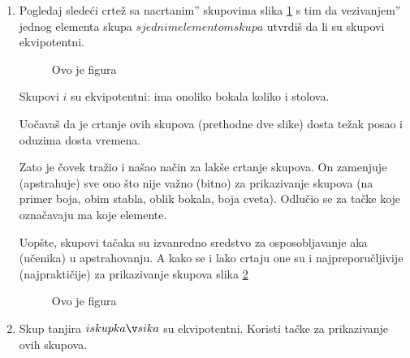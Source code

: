 

    \begin{enumerate}           %

    \item Pogledaj slede\' ci crte\v z sa nacrtanim'' skupovima slika \ref{slika1str26} s tim da vezivanjem'' jednog elementa skupa $ s jednim elementom skupa $ utvrdi\v s da li su skupovi ekvipotentni.

    

       \begin{figure}[h]

          \center


         \caption{Ovo je figura}\label{slika1str26}

       \end{figure} 

    

    Skupovi $ i $ su ekvipotentni: ima onoliko bokala koliko i stolova.



    Uo\v cava\v s da je crtanje ovih skupova (prethodne dve slike) dosta te\v zak posao i oduzima dosta vremena.



    Zato je \v covek tra\v zio i na\v sao na\v cin za lak\v se crtanje skupova. On zamenjuje (apstrahuje) sve ono \v sto nije va\v zno (bitno) za prikazivanje skupova (na primer boja, obim stabla, oblik bokala, boja cveta). Odlu\v cio se za ta\v cke koje ozna\v cavaju ma koje elemente.



    Uop\v ste, skupovi ta\v caka su izvanredno sredstvo za osposobljavanje \dj aka (u\v cenika) u apstrahovanju. A kako se i lako crtaju one su i najpreporu\v cljivije (najprakti\v cije) za prikazivanje skupova slika \ref{slika2str26}

        \begin{figure}[h]

            \center


            \caption{Ovo je figura}\label{slika2str26}

        \end{figure} 

    \item Skup tanjira $  i skup ka\v sika $ su ekvipotentni. Koristi ta\v cke za prikazivanje ovih skupova.

    \end{enumerate}

